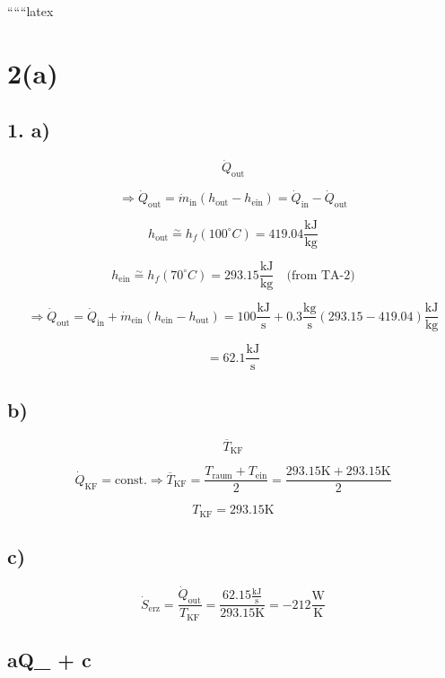 
``````latex


\section*{2(a)}

\subsection*{1. a)}

\[
\dot{Q}_{\text{out}}
\]

\[
\Rightarrow \dot{Q}_{\text{out}} = \dot{m}_{\text{in}} (h_{\text{out}} - h_{\text{ein}}) = \dot{Q}_{\text{in}} - \dot{Q}_{\text{out}}
\]

\[
h_{\text{out}} \overset{\sim}{=} h_f (100^\circ C) = 419.04 \frac{\text{kJ}}{\text{kg}}
\]

\[
h_{\text{ein}} \overset{\sim}{=} h_f (70^\circ C) = 293.15 \frac{\text{kJ}}{\text{kg}} \quad \text{(from TA-2)}
\]

\[
\Rightarrow \dot{Q}_{\text{out}} = \dot{Q}_{\text{in}} + \dot{m}_{\text{ein}} (h_{\text{ein}} - h_{\text{out}}) = 100 \frac{\text{kJ}}{\text{s}} + 0.3 \frac{\text{kg}}{\text{s}} (293.15 - 419.04) \frac{\text{kJ}}{\text{kg}}
\]

\[
= 62.1 \frac{\text{kJ}}{\text{s}}
\]

\subsection*{b)}

\[
\overline{T}_{\text{KF}}
\]

\[
\dot{Q}_{\text{KF}} = \text{const.} \Rightarrow \overline{T}_{\text{KF}} = \frac{T_{\text{raum}} + T_{\text{ein}}}{2} = \frac{293.15 \text{K} + 293.15 \text{K}}{2}
\]

\[
T_{\text{KF}} = 293.15 \text{K}
\]

\subsection*{c)}

\[
\dot{S}_{\text{erz}} = \frac{\dot{Q}_{\text{out}}}{T_{\text{KF}}} = \frac{62.15 \frac{\text{kJ}}{\text{s}}}{293.15 \text{K}} = -212 \frac{\text{W}}{\text{K}}
\]

\subsection*{aQ_{} + c}

